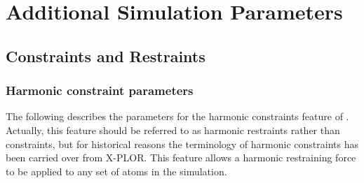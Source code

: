 
\section{Additional Simulation Parameters}
\label{section:add}

\subsection{Constraints and Restraints}
\label{section:config_add}

\subsubsection{Harmonic constraint parameters}

The following describes the parameters for the 
harmonic constraints feature of \NAMD.  Actually, this feature 
should be referred to as harmonic restraints rather than 
constraints, but for historical reasons the terminology of 
harmonic constraints has been carried over from X-PLOR.  
This feature allows a harmonic restraining force to be applied 
to any set of atoms in the simulation.

